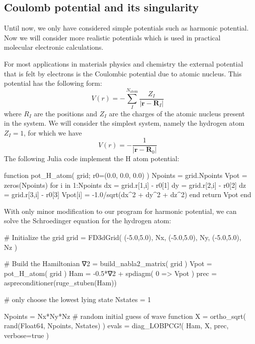 \subsection{Coulomb potential and its singularity}

Until now, we only have considered simple potentials such as harmonic potential. Now we will
consider more realistic potentials which is used in practical molecular electronic calculations.

For most applications in materials physics and chemistry the external potential that is
felt by electrons is the Coulombic potential due to atomic nucleus. This potential has
the following form:
\begin{equation}
V(r) = -\sum_{I}^{N_{\mathrm{atom}}} \frac{Z_{I}}{\left|\mathbf{r} - \mathbf{R}_{I}\right|}
\end{equation}
where $R_{I}$ are the positions and $Z_{I}$ are the charges
of the atomic nucleus present in the system.
%
We will consider the simplest system, namely the hydrogen atom $Z_{I}=1$, for which we have
\begin{equation}
V(r) = -\frac{1}{\left|\mathbf{r} - \mathbf{R}_{0}\right|}
\end{equation}
%
The following Julia code implement the H atom potential:
\begin{juliacode}
function pot_H_atom( grid; r0=(0.0, 0.0, 0.0) )
    Npoints = grid.Npoints
    Vpot = zeros(Npoints)
    for i in 1:Npoints
        dx = grid.r[1,i] - r0[1]
        dy = grid.r[2,i] - r0[2]
        dz = grid.r[3,i] - r0[3]
        Vpot[i] = -1.0/sqrt(dx^2 + dy^2 + dz^2)
    end
    return Vpot
end
\end{juliacode}

With only minor modification to our program for harmonic potential, we can solve the Schroedinger
equation for the hydrogen atom:
\begin{juliacode}
# Initialize the grid
grid = FD3dGrid(
  (-5.0,5.0), Nx,
  (-5.0,5.0), Ny,
  (-5.0,5.0), Nz
)

# Build the Hamiltonian
∇2 = build_nabla2_matrix( grid )
Vpot = pot_H_atom( grid )
Ham = -0.5*∇2 + spdiagm( 0 => Vpot )
prec = aspreconditioner(ruge_stuben(Ham))

# only choose the lowest lying state
Nstates = 1

Npoints = Nx*Ny*Nz
# random initial guess of wave function
X = ortho_sqrt( rand(Float64, Npoints, Nstates) )
evals = diag_LOBPCG!( Ham, X, prec, verbose=true )
\end{juliacode}

